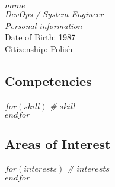 \documentclass[$fontsize$, a4paper]{article}
\begin{document}

\begin{multicols}{2}

  {\LARGE $name$}\\[.2cm]
  {\large \textsl{DevOps / System Engineer}}\\[.1cm]




\columnbreak
\emph{Personal information}\\
Date of Birth: 1987\\
Citizenship: Polish\\

\end{multicols}






\begin{multicols}{2}

\subsection*{Competencies}
$for(skill)$
\emph{\#} \enspace $skill$\\
$endfor$

\columnbreak

\subsection*{Areas of Interest}
$for(interests)$
\emph{\#} \enspace $interests$\\
$endfor$

\end{multicols}


\end{document}
